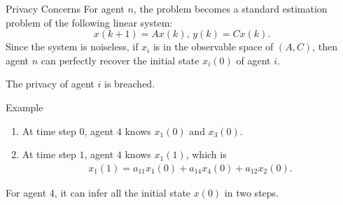 \documentclass[10pt]{beamer}
\DeclareMathOperator{\1}{\textbf{1}}
\begin{document}
	  \begin{frame}{Privacy Concerns}
	    For agent $n$, the problem becomes a standard estimation problem of the following linear system: 
	    \begin{displaymath}
	      x(k+1) = A x(k),\,y(k) = C x(k). 
	    \end{displaymath}
	    Since the system is noiseless, if $x_i$ is in the observable space of $(A,C)$, then agent $n$ can perfectly recover the initial state $x_i(0)$ of agent $i$. 

	    \alert{The privacy of agent $i$ is breached.}
	  \end{frame}

	  \begin{frame}{Example}
	    \begin{center}
	    \end{center}
	    \begin{enumerate}
	      \item At time step $0$, agent $4$ knows $x_1(0)$ and $x_3(0)$.
	      \item At time step $1$, agent $4$ knows $x_1(1)$, which is
		\begin{align*}
		  x_1(1) = a_{11}x_1(0)+a_{14}x_4(0)+a_{12}x_2(0).    
		\end{align*}
	    \end{enumerate}

	    For agent $4$, it can infer all the initial state $x(0)$ in two steps.

	  \end{frame}
\end{document}
